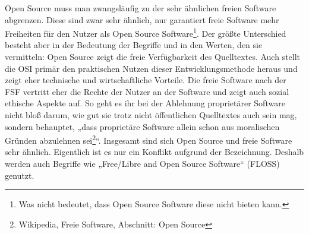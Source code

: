 \documentclass[a4paper,12pt]{article}
\begin{document}
Open Source muss man zwangsläufig zu der sehr ähnlichen freien Software abgrenzen. Diese sind zwar sehr ähnlich, nur garantiert freie Software mehr Freiheiten für den Nutzer als Open Source Software\footnote{Was nicht bedeutet, dass Open Source Software diese nicht bieten kann.}. Der größte Unterschied besteht aber in der Bedeutung der Begriffe und in den Werten, den sie vermitteln: Open Source zeigt die freie Verfügbarkeit des Quelltextes. Auch stellt die OSI primär den praktischen Nutzen dieser Entwicklungsmethode heraus und zeigt eher technische und wirtschaftliche Vorteile. Die freie Software nach der FSF vertritt eher die Rechte der Nutzer an der Software und zeigt auch sozial ethische Aspekte auf. So geht es ihr bei der Ablehnung proprietärer Software nicht bloß darum, wie gut sie trotz nicht öffentlichen Quelltextes auch sein mag, sondern behauptet, „dass proprietäre Software allein schon aus moralischen Gründen abzulehnen sei\footnote{Wikipedia, Freie Software, Abschnitt: Open Source}“. Insgesamt sind sich Open Source und freie Software sehr ähnlich. Eigentlich ist es nur ein Konflikt aufgrund der Bezeichnung. Deshalb werden auch Begriffe wie „Free/Libre and Open Source Software“ (FLOSS) genutzt.
\end{document}
